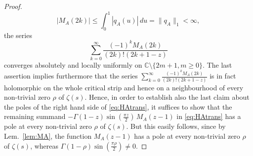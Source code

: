 \documentclass[10pt,a4paper]{amsart}
\begin{document}
\begin{proof}
$$|M_A(2k)| \leq \int_0^1 |q_A(u)|\,du =\|q_A\|_1<\infty,$$
the series 
$$\sum_{k=0}^{\infty}\frac{(-1)^k M_A(2k)}{(2k)!(2k+1-z)}$$
converges absolutely and locally uniformly on $\mathbb C\setminus\{2m+1, m\geq 0\}$. The last assertion implies furthermore that the series $\sum_{k=0}^{\infty}\frac{(-1)^k M_A(2k)}{(2k)!(2k+1-z)}$ is in fact holomorphic on the whole critical strip and hence on a neighbourhood of every non-trivial zero $\rho$ of $\zeta(s)$. Hence, in order to establish also the last claim about the poles of the right hand side of \eqref{eq:HAtrans}, it suffices to show that the remaining summand $-\Gamma(1-z)\sin\left(\frac{\pi z}{2}\right)\,M_A(z-1)$ in \eqref{eq:HAtrans} has a pole at every non-trivial zero $\rho$ of $\zeta(s)$. But this easily follows, since by Lem.\ \ref{lem:MA}, the function $M_A(z-1)$ has a pole at every non-trivial zero $\rho$ of $\zeta(s)$, whereas $\Gamma(1-\rho)\sin\left(\frac{\pi \rho}{2}\right)\neq 0$.
\end{proof}
\end{document}
